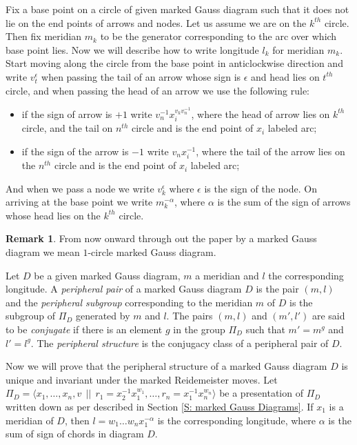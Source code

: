 \documentclass[11 pt, reqno]{amsart}
\theoremstyle{definition}
\newtheorem{remark}[theorem]{Remark}
\numberwithin{equation}{subsection}
\begin{document}
Fix a base point on a circle of given marked Gauss diagram such that it does not lie on the end points of arrows and nodes. Let us assume we are on the $k^{th}$ circle. Then fix meridian $m_k$ to be the generator corresponding to the arc over which base point lies. Now we will describe how to write longitude $l_k$ for meridian $m_k$. Start moving along the circle from the base point in anticlockwise direction and write $v_t^{\epsilon}$ when passing the tail of an arrow whose sign is $\epsilon$ and head lies on $t^{th}$ circle, and
when passing the head of an arrow we use the following rule:
\begin{itemize}
\item if the sign of arrow is $+1$ write $v_n^{-1} x_i^{v_k v_n ^{-1}}$, where the head of arrow lies on $k^{th}$ circle, and the tail on $n^{th}$ circle and is the end point of $x_i$ labeled arc;

\item if the sign of the arrow is $-1$ write $v_n x_i ^{-1}$, where the tail of the arrow lies on the $n^{th}$ circle and is the end point of $x_i$ labeled arc;
\end{itemize}
And when we pass a node we write $v_{k}^{\epsilon}$ where $\epsilon$ is the sign of the node. On arriving at the base point we write $m_k^{-\alpha}$, where $\alpha$ is the sum of the sign of arrows whose head lies on the $k^{th}$ circle.
\par 

\begin{remark}
From now onward through out the paper by a marked Gauss diagram we mean $1$-circle marked Gauss diagram.
\end{remark}


\par
Let $D$ be a given marked Gauss diagram, $m$ a meridian and $l$ the corresponding longitude. A \textit{peripheral pair} of a marked Gauss diagram $D$ is the pair $(m, l)$ and the \textit{peripheral subgroup} corresponding to the meridian $m$ of $D$ is the subgroup of $\Pi_D$ generated by $m$ and $l$.
The pairs $(m,l)$ and $(m',l')$ are said to be \textit{conjugate} if there is an element $g$ in the group $\Pi_D$ such that $m'=m^g$ and $l'=l^g$. The \textit{peripheral structure} is the conjugacy class of a peripheral pair of $D$.
\par
Now we will prove that the peripheral structure of a marked Gauss diagram $D$ is unique and invariant under the marked Reidemeister moves.
Let $\Pi_D= \langle x_1, \ldots, x_n, v~~||~~r_1=x_2^{-1}x_1^{w_1}, \ldots, r_n=x_1^{-1}x_n^{w_n} \rangle$ be a presentation of $\Pi_D$ written down as per described in Section \ref{S: marked Gauss Diagrams}. If $x_1$ is a meridian of $D$, then $l=w_1\ldots w_n x_1^{-\alpha}$ is the corresponding longitude, where $\alpha$ is the sum of sign of chords in diagram $D$.
\end{document}
